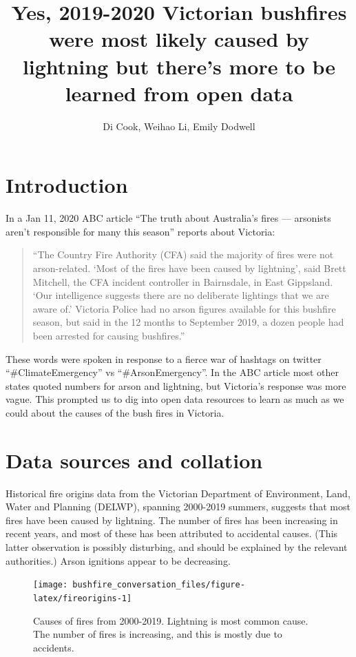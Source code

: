 \documentclass[
  11pt,
  a4paper,
]{article}
\title{Yes, 2019-2020 Victorian bushfires were most likely caused by lightning but there's more to be learned from open data}
\author{Di Cook, Weihao Li, Emily Dodwell}
\date{}
\begin{document}
\maketitle

\hypertarget{intro}{%
\section{Introduction}\label{intro}}

In a Jan 11, 2020 ABC article ``The truth about Australia's fires --- arsonists aren't responsible for many this season'' reports about Victoria:

\begin{quote}
``The Country Fire Authority (CFA) said the majority of fires were not arson-related. `Most of the fires have been caused by lightning', said Brett Mitchell, the CFA incident controller in Bairnsdale, in East Gippsland. `Our intelligence suggests there are no deliberate lightings that we are aware of.' Victoria Police had no arson figures available for this bushfire season, but said in the 12 months to September 2019, a dozen people had been arrested for causing bushfires.''
\end{quote}

These words were spoken in response to a fierce war of hashtags on twitter ``\#ClimateEmergency'' vs ``\#ArsonEmergency''. In the ABC article most other states quoted numbers for arson and lightning, but Victoria's response was more vague. This prompted us to dig into open data resources to learn as much as we could about the causes of the bush fires in Victoria.

\hypertarget{data}{%
\section{Data sources and collation}\label{data}}

Historical fire origins data from the Victorian Department of Environment, Land, Water and Planning (DELWP), spanning 2000-2019 summers, suggests that most fires have been caused by lightning. The number of fires has been increasing in recent years, and most of these has been attributed to accidental causes. (This latter observation is possibly disturbing, and should be explained by the relevant authorities.) Arson ignitions appear to be decreasing.

\begin{figure}[H]

{\centering \texttt{[image: bushfire\_conversation\_files/figure-latex/fireorigins-1]} 

}

\caption{Causes of fires from 2000-2019. Lightning is most common cause. The number of fires is increasing, and this is mostly due to accidents.}\label{fig:fireorigins}
\end{figure}
\end{document}
